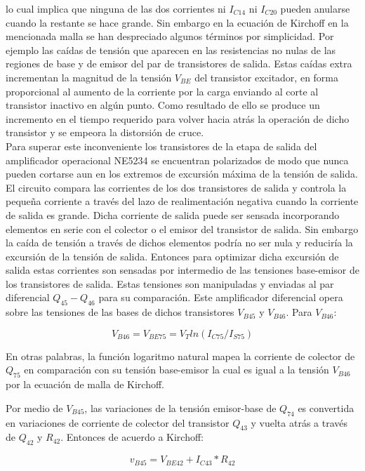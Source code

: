\documentclass[12pt,a4paper,final,headinclude,footinclude,BCOR5mm]{scrartcl}
\begin{document}
lo cual implica que ninguna de las dos corrientes ni $I_{C14}$ ni $I_{C20}$ pueden anularse cuando la restante se hace grande. Sin embargo en la ecuación de Kirchoff en la mencionada malla se han despreciado algunos términos por simplicidad. Por ejemplo las caídas de tensión que aparecen en las resistencias no nulas de las regiones de base y de emisor del par de transistores de salida. Estas caídas extra incrementan la magnitud de la tensión $V_{BE}$ del transistor excitador, en forma proporcional al aumento de la corriente por la carga enviando al corte al transistor inactivo en algún punto. Como resultado de ello se produce un incremento en el tiempo requerido para volver hacia atrás la operación de dicho transistor y se empeora la distorsión de cruce.\\

Para superar este inconveniente los transistores de la etapa de salida del amplificador operacional NE5234 se encuentran polarizados de modo que nunca pueden cortarse aun en los extremos de excursión máxima de la tensión de salida. El circuito compara las corrientes de los dos transistores de salida y controla la pequeña corriente a través del lazo de realimentación negativa cuando la corriente de salida es grande. Dicha corriente de salida puede ser sensada incorporando elementos en serie con el colector o el emisor del transistor de salida. Sin embargo la caída de tensión a través de dichos elementos podría no ser nula y reduciría la excursión de la tensión de salida. Entonces para optimizar dicha excursión de salida estas corrientes son sensadas por intermedio de las tensiones base-emisor de los transistores de salida. Estas tensiones son manipuladas y enviadas al par diferencial $Q_{45}-Q_{46}$ para su comparación. Este amplificador diferencial opera sobre las tensiones de las bases de dichos transistores $V_{B45}$ y $V_{B46}$. Para $V_{B46}$:

$$V_{B46} = V_{BE75} = V_{T} ln(I_{C75}/I_{S75})$$

En otras palabras, la función logaritmo natural mapea la corriente de colector de $Q_{75}$ en comparación con su tensión base-emisor la cual es igual a la tensión $V_{B46}$ por la ecuación de malla de Kirchoff.

Por medio de $V_{B45}$, las variaciones de la tensión emisor-base de $Q_{74}$ es convertida en variaciones de corriente de colector del transistor $Q_{43}$ y vuelta atrás a través de $Q_{42}$ y $R_{42}$. Entonces de acuerdo a Kirchoff:

$$v_{B45} = V_{BE42} + I_{C43}*R_{42}$$
\end{document}
